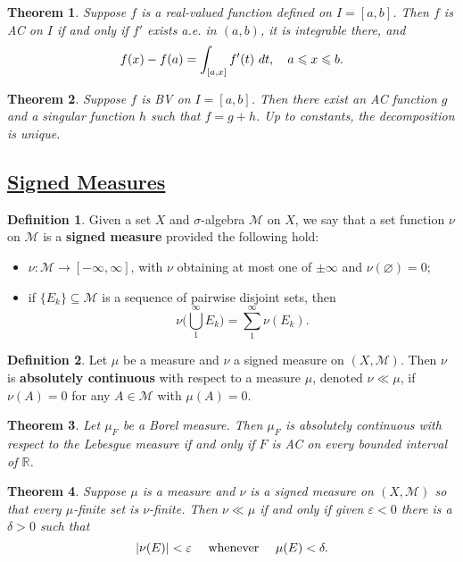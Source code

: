 \documentclass[11pt]{amsart}
\newtheorem*{theorem*}{Theorem}
\theoremstyle{definition}
\newtheorem*{definition*}{Definition}
\renewcommand\emptyset{\varnothing}
\renewcommand\leq{\leqslant}
\renewcommand\:{\colon}
\newcommand{\calM}{\mathcal{M}}
\newcommand{\R}{\mathds{R}}
\newcommand{\dt}{\ dt}
\begin{document}
\begin{theorem*}
	Suppose $f$ is a real-valued function defined on $I = [a,b]$. Then $f$ is AC on $I$ if and only if $f'$ exists a.e. in $(a, b)$, it is integrable there, and 
		\[ f(x) - f(a) = \int_{[a,x]} f'(t) \dt, \hskip10pt a \leq x \leq b. \]
\end{theorem*}

\begin{theorem*}
	Suppose $f$ is BV on $I = [a,b]$. Then there exist an AC function $g$ and a singular function $h$ such that $f = g + h$. Up to constants, the decomposition is unique.
\end{theorem*}
\vskip20pt



\subsection*{\underline{Signed Measures}}

\begin{definition*}
	Given a set $X$ and $\sigma$-algebra $\calM$ on $X$, we say that a set function $\nu$ on $\calM$ is a \textbf{signed measure} provided the following hold:
	\begin{itemize}[leftmargin=*]\setlength\itemsep{0em}
		\item $\nu\: \calM \to [-\infty, \infty]$, with $\nu$ obtaining at most one of $\pm \infty$ and $\nu(\emptyset) = 0$;
		\item if $\{E_k\} \subseteq \calM$ is a sequence of pairwise disjoint sets, then 
			\[ \nu\bigg( \bigcup_1^\infty E_k \bigg) = \sum_1^\infty \nu(E_k). \]
	\end{itemize}
\end{definition*}

\begin{definition*}
	Let $\mu$ be a measure and $\nu$ a signed measure on $(X, \calM)$. Then $\nu$ is \textbf{absolutely continuous} with respect to a measure $\mu$, denoted $\nu \ll \mu$, if $\nu(A) = 0$ for any $A \in \calM$ with $\mu(A) = 0$.
\end{definition*}

\begin{theorem*}
	Let $\mu_F$ be a Borel measure. Then $\mu_F$ is absolutely continuous with respect to the Lebesgue measure if and only if $F$ is AC on every bounded interval of $\R$.
\end{theorem*}

\begin{theorem*}
	Suppose $\mu$ is a measure and $\nu$ is a signed measure on $(X, \calM)$ so that every $\mu$-finite set is $\nu$-finite. Then $\nu \ll \mu$ if and only if given $\varepsilon < 0$ there is a $\delta > 0$ such that 
		\[ |\nu(E)| < \varepsilon \hskip10pt \textnormal{ whenever } \hskip10pt \mu(E) < \delta. \]
\end{theorem*}
\end{document}
